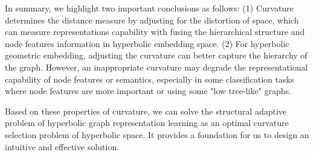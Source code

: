 In summary, 
we highlight two important conclusions as follows:
(1) Curvature determines the distance measure by adjusting for the distortion of space, which can measure representations capability with fusing the hierarchical structure and node features information in hyperbolic embedding space. 
(2) For hyperbolic geometric embedding, adjusting the curvature can better capture the hierarchy of the graph. 
However, an inappropriate curvature may degrade the representational capability of node features or semantics, especially in some classification tasks where node features are more important or using some "low tree-like" graphs. 

Based on these properties of curvature, we can solve the structural adaptive problem of hyperbolic graph representation learning as an optimal curvature selection problem of hyperbolic space. 
It provides a foundation for us to design an intuitive and effective solution. 